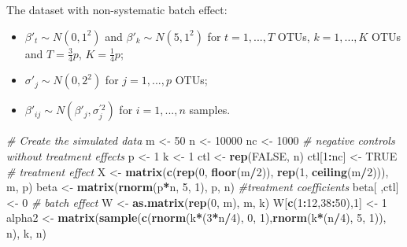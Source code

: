\documentclass[]{book}
\newenvironment{Shaded}{\begin{snugshade}}{\end{snugshade}}
\newcommand{\KeywordTok}[1]{\textcolor[rgb]{0.13,0.29,0.53}{\textbf{#1}}}
\newcommand{\DecValTok}[1]{\textcolor[rgb]{0.00,0.00,0.81}{#1}}
\newcommand{\StringTok}[1]{\textcolor[rgb]{0.31,0.60,0.02}{#1}}
\newcommand{\CommentTok}[1]{\textcolor[rgb]{0.56,0.35,0.01}{\textit{#1}}}
\newcommand{\OtherTok}[1]{\textcolor[rgb]{0.56,0.35,0.01}{#1}}
\newcommand{\OperatorTok}[1]{\textcolor[rgb]{0.81,0.36,0.00}{\textbf{#1}}}
\newcommand{\NormalTok}[1]{#1}
\providecommand{\tightlist}{%
  \setlength{\itemsep}{0pt}\setlength{\parskip}{0pt}}
\begin{document}
The dataset with non-systematic batch effect:

\begin{itemize}
\tightlist
\item
  \(\beta'_{t} \sim N(0,1^{2})\) and \(\beta'_{k} \sim N(5,1^{2})\) for
  \(t=1,...,T\) OTUs, \(k=1,...,K\) OTUs and \(T=\frac{3}{4}p\),
  \(K=\frac{1}{4}p\);\\
\item
  \(\sigma'_{j} \sim N(0,2^{2})\) for \(j=1,...,p\) OTUs;\\
\item
  \(\beta'_{ij} \sim N(\beta'_{j}, \sigma_{j}^{'2})\) for
  \(i = 1,...,n\) samples.
\end{itemize}

\begin{Shaded}
\begin{Highlighting}[]
\CommentTok{# Create the simulated data}
\NormalTok{m <-}\StringTok{ }\DecValTok{50}
\NormalTok{n <-}\StringTok{ }\DecValTok{10000}
\NormalTok{nc <-}\StringTok{ }\DecValTok{1000} \CommentTok{# negative controls without treatment effects}
\NormalTok{p <-}\StringTok{ }\DecValTok{1}
\NormalTok{k <-}\StringTok{ }\DecValTok{1}
\NormalTok{ctl <-}\StringTok{ }\KeywordTok{rep}\NormalTok{(}\OtherTok{FALSE}\NormalTok{, n)}
\NormalTok{ctl[}\DecValTok{1}\OperatorTok{:}\NormalTok{nc] <-}\StringTok{ }\OtherTok{TRUE}
\CommentTok{# treatment effect}
\NormalTok{X <-}\StringTok{ }\KeywordTok{matrix}\NormalTok{(}\KeywordTok{c}\NormalTok{(}\KeywordTok{rep}\NormalTok{(}\DecValTok{0}\NormalTok{, }\KeywordTok{floor}\NormalTok{(m}\OperatorTok{/}\DecValTok{2}\NormalTok{)), }\KeywordTok{rep}\NormalTok{(}\DecValTok{1}\NormalTok{, }\KeywordTok{ceiling}\NormalTok{(m}\OperatorTok{/}\DecValTok{2}\NormalTok{))), m, p)}
\NormalTok{beta <-}\StringTok{ }\KeywordTok{matrix}\NormalTok{(}\KeywordTok{rnorm}\NormalTok{(p}\OperatorTok{*}\NormalTok{n, }\DecValTok{5}\NormalTok{, }\DecValTok{1}\NormalTok{), p, n) }\CommentTok{#treatment coefficients}
\NormalTok{beta[ ,ctl] <-}\StringTok{ }\DecValTok{0}
\CommentTok{# batch effect}
\NormalTok{W <-}\StringTok{ }\KeywordTok{as.matrix}\NormalTok{(}\KeywordTok{rep}\NormalTok{(}\DecValTok{0}\NormalTok{, m), m, k)}
\NormalTok{W[}\KeywordTok{c}\NormalTok{(}\DecValTok{1}\OperatorTok{:}\DecValTok{12}\NormalTok{,}\DecValTok{38}\OperatorTok{:}\DecValTok{50}\NormalTok{),}\DecValTok{1}\NormalTok{] <-}\StringTok{  }\DecValTok{1}
\NormalTok{alpha2 <-}\StringTok{ }\KeywordTok{matrix}\NormalTok{(}\KeywordTok{sample}\NormalTok{(}\KeywordTok{c}\NormalTok{(}\KeywordTok{rnorm}\NormalTok{(k}\OperatorTok{*}\NormalTok{(}\DecValTok{3}\OperatorTok{*}\NormalTok{n}\OperatorTok{/}\DecValTok{4}\NormalTok{), }\DecValTok{0}\NormalTok{, }\DecValTok{1}\NormalTok{),}\KeywordTok{rnorm}\NormalTok{(k}\OperatorTok{*}\NormalTok{(n}\OperatorTok{/}\DecValTok{4}\NormalTok{), }\DecValTok{5}\NormalTok{, }\DecValTok{1}\NormalTok{)), n), k, n)}

\end{Highlighting}
\end{Shaded}
\end{document}
